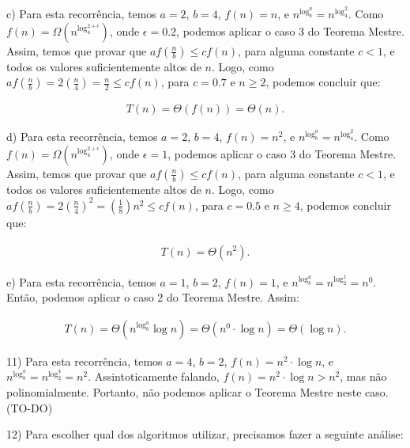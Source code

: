 \documentclass[]{article}
\begin{document}
c) Para esta recorrência, temos $a=2$, $b=4$, $f(n)=n$, e $n^{\log_b^a} = n^{\log_4^2}$. Como $f(n)=\Omega(n^{\log_4^{2+\epsilon}})$, onde $\epsilon = 0.2$, podemos aplicar o caso 3 do Teorema Mestre. Assim, temos que provar que $af(\frac{n}{b}) \leq cf(n)$, para alguma constante $c<1$, e todos os valores suficientemente altos de $n$. Logo, como $af(\frac{n}{b}) = 2(\frac{n}{4}) = \frac{n}{2} \leq cf(n)$, para $c=0.7$ e $n \geq 2$, podemos concluir que:

\begin{align*}
    T(n) = \Theta(f(n)) = \Theta(n).
\end{align*}

\vspace{0.5cm}

d) Para esta recorrência, temos $a=2$, $b=4$, $f(n)=n^2$, e $n^{\log_b^a} = n^{\log_4^2}$. Como $f(n)=\Omega(n^{\log_4^{2+\epsilon}})$, onde $\epsilon = 1$, podemos aplicar o caso 3 do Teorema Mestre. Assim, temos que provar que $af(\frac{n}{b}) \leq cf(n)$, para alguma constante $c<1$, e todos os valores suficientemente altos de $n$. Logo, como $af(\frac{n}{b}) = 2(\frac{n}{4})^2 = (\frac{1}{8})n^2 \leq cf(n)$, para $c=0.5$ e $n \geq 4$, podemos concluir que:

\begin{align*}
    T(n) = \Theta(n^2).
\end{align*}

\vspace{0.5cm}

e) Para esta recorrência, temos $a=1$, $b=2$, $f(n)=1$, e $n^{\log_b^a} = n^{\log_2^1} = n^0$. Então, podemos aplicar o caso 2 do Teorema Mestre. Assim:

\begin{align*}
    T(n) = \Theta(n^{\log_b^a} \log n) = \Theta(n^0 \cdot \log n) = \Theta(\log n).
\end{align*}

\vspace{1cm}

11) Para esta recorrência, temos $a=4$, $b=2$, $f(n)=n^2 \cdot \log n$, e $n^{\log_b^a} = n^{\log_2^4} = n^2$. Assintoticamente falando, $f(n)=n^2 \cdot \log n > n^2$, mas não polinomialmente. Portanto, não podemos aplicar o Teorema Mestre neste caso. (TO-DO)

\vspace{1cm}

12) Para escolher qual dos algoritmos utilizar, precisamos fazer a seguinte análise:

\vspace{0.5cm}
\end{document}
